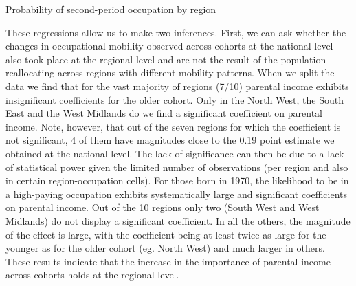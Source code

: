 \begin{table}[!tb]
    \centering
    \caption{Probability of second-period occupation by region}
    \label{chap2-tab:reg-multi2-short}
\end{table}

These regressions allow us to make two inferences. First, we can ask whether the changes in occupational mobility observed across cohorts at the national level also took place at the regional level and are not the result of the population reallocating across regions with different mobility patterns. When we split the data we find that for the vast majority of regions (7/10) parental income exhibits insignificant coefficients for the older cohort. Only in the North West, the South East and the West Midlands do we find a significant coefficient on parental income. Note, however, that out of the seven regions for which the coefficient is not significant, 4 of them have magnitudes close to the 0.19 point estimate we obtained at the national level. The lack of significance can then be due to a lack of statistical power given the limited number of observations (per region and also in certain region-occupation cells). For those born in 1970, the likelihood to be in a high-paying occupation exhibits systematically large and significant coefficients on parental income. Out of the 10 regions only two (South West and West Midlands) do not display a significant coefficient. In all the others, the magnitude of the effect is large, with the coefficient being at least twice as large for the younger as for the older cohort (eg. North West) and much larger in others. These results indicate that the increase in the importance of parental income across cohorts holds at the regional level.

